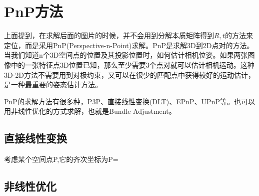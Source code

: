 \section{PnP方法}
上面提到，在求解后面的图片的时候，并不会用到分解本质矩阵得到$R,t$的方法来定位，而是采用PnP(Perspective-n-Point)求解。PnP是求解3D到2D点对的方法。当我们知道n个3D空间点的位置及其投影位置时，如何估计相机位姿。如果两张图像中的一张特征点3D位置已知，那么至少需要3个点对就可以估计相机运动。这种3D-2D方法不需要用到对极约束，又可以在很少的匹配点中获得较好的运动估计，是一种最重要的姿态估计方法。\par
PnP的求解方法有很多种，P3P\cite{gao2003complete}、直接线性变换(DLT)、EPnP\cite{lepetit2009epnp}、UPnP\cite{penate2013exhaustive}等。也可以用非线性优化的方式求解，也就是Bundle Adjustment。
\subsection{直接线性变换}
考虑某个空间点P,它的齐次坐标为P={}
\subsection{非线性优化}





